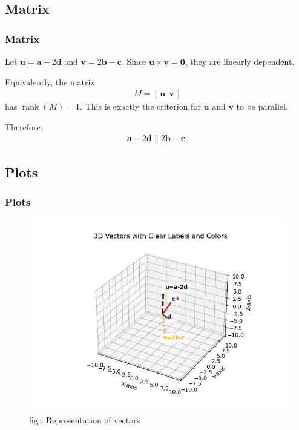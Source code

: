 \documentclass{beamer}
\theoremstyle{remark}
\let\vec\mathbf
\numberwithin{equation}{section}
\begin{document}
\subsection{Matrix}
\begin{frame}
\frametitle{Matrix}

Let $\vec u=\vec a-2\vec d$ and $\vec v=2\vec b-\vec c$.  
Since $\vec u\times \vec v=\vec 0$, they are linearly dependent.

Equivalently, the matrix
\begin{align}
M = [\,\mathbf u \ \ \mathbf v\,]
\end{align}
has $\operatorname{rank}(M)=1$.
 This is exactly the criterion for $\vec u$ and $\vec v$ to be parallel.

Therefore,
\begin{align}
\boxed{\,\vec a-2\vec d \parallel 2\vec b-\vec c\,}.
\end{align}
\end{frame}

\subsection{Plots}
\begin{frame}
\frametitle{Plots}
\begin{figure}
\centering
\includegraphics[width=0.9\columnwidth]{figs/fig4.png}
\caption{fig : Representation of vectors}
\label{Fig4}
\end{figure}
\end{frame}
\end{document}
